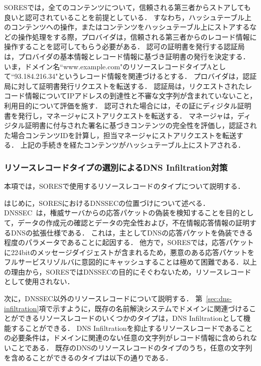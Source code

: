 SORESでは，全てのコンテンツについて，信頼される第三者からストアしても良いと認可されていることを前提としている．
すなわち，ハッシュテーブル上のコンテンツへの操作，またはコンテンツをハッシュテーブル上にストアするなどの操作処理をする際，プロバイダは，信頼される第三者からのレコード情報に操作することを認可してもらう必要がある．
認可の証明書を発行する認証局は，プロバイダの基本情報とレコード情報に基づき証明書の発行を決定する．
いま，ドメイン名``www.example.com"のリソースレコードタイプAとして``93.184.216.34"というレコード情報を関連づけるとする．
プロバイダは，認証局に対して証明書発行リクエストを転送する．
認証局は，リクエストされたレコード情報についてIPアドレスの到達性と不審な文字列が含まれていないこと，利用目的について評価を施す．
認可された場合には，その証にディジタル証明書を発行し，マネージャにストアリクエストを転送する．
マネージャは，ディジタル証明書に付与された署名に基づきコンテンツの完全性を評価し，認証された場合コンテンツIDを計算し，担当マネージャにストアリクエストを転送する．
上記の手続きを経たコンテンツがハッシュテーブル上にストアされる．


\subsubsection{リソースレコードタイプの選別によるDNS Infiltration対策}
本項では，SORESで使用するリソースレコードのタイプについて説明する．

はじめに，SORESにおけるDNSSECの位置づけについて述べる．
DNSSEC~\cite{rfc4033}は，権威サーバからの応答パケットの偽装を検知することを目的として，データの作成元の確認とデータの完全性および，不在情報応答情報の証明するDNSの拡張仕様である．
これは，主としてDNSの応答パケットを偽装できる程度のパラメータであることに起因する．
他方で，SORESでは，応答パケットに224bitのメッセージダイジェストが含まれるため，悪意のある応答パケットをフルサービスリゾルバに意図的にキャッシュすることは極めて困難である．以上の理由から，SORESではDNSSECの目的にそぐわないため，リソースレコードとして使用されない．

次に，DNSSEC以外のリソースレコードについて説明する．
第~\ref{sec:dns-infiltration}項で示すように，既存の名前解決システムでドメインに関連づけることができるリソースレコードのいくつかのタイプは，DNS Infiltrationとして機能することができる．
DNS Infiltrationを抑止するリソースレコードであることの必要条件は，ドメインに関連のない任意の文字列がレコード情報に含められないことである．
既存のDNSのリソースレコードのタイプのうち，任意の文字列を含めることができるのタイプは以下の通りである．



